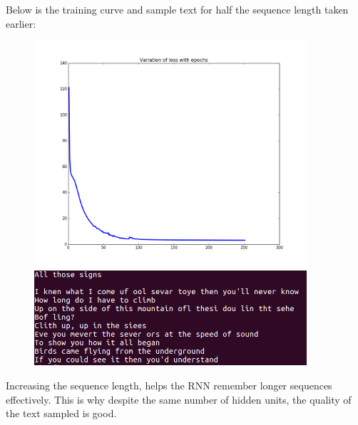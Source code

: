\documentclass{article}
\begin{document}
\begin{flushleft}
\begin{itemize}
Below is the training curve and sample text for half the sequence length taken earlier:
\begin{figure}[H]
\begin{minipage}{0.475\linewidth}
\centering
\includegraphics[width=0.9\textwidth]{RNN_training_SL0_5x.png}
\end{minipage}
\hfill
\begin{minipage}{0.475\linewidth}
\centering
\includegraphics[width=0.9\textwidth]{RNN_text_SL0_5x.png}
\end{minipage}
\end{figure}
\end{itemize}

Increasing the sequence length, helps the RNN remember longer sequences effectively. This is why despite the same number of hidden units, the quality of the text sampled is good.
\end{flushleft}
\end{document}
